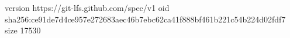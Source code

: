 version https://git-lfs.github.com/spec/v1
oid sha256:ce91de7d4ce957e272683aec46b7ebc62ca41f888bf461b221c54b224d02fdf7
size 17530
